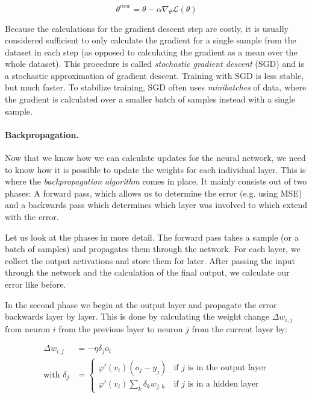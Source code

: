 \begin{equation*}
  \theta^{new} = \theta - \alpha \nabla_\theta \mathcal{L}(\theta)
\end{equation*}

Because the calculations for the gradient descent step are costly, it is usually considered sufficient to only calculate the gradient for a single sample from the dataset in each step (as opposed to calculating the gradient as a mean over the whole dataset). This procedure is called \textit{stochastic gradient descent} (SGD) and is a stochastic approximation of gradient descent. Training with SGD is less stable, but much faster. To stabilize training, SGD often uses \textit{minibatches} of data, where the gradient is calculated over a smaller batch of samples instead with a single sample.

\paragraph{Backpropagation.} Now that we know how we can calculate updates for the neural network, we need to know how it is possible to update the weights for each individual layer. This is where the \textit{backpropagation algorithm} comes in place. It mainly consists out of two phases: A forward pass, which allows us to determine the error (e.g. using MSE) and a backwards pass which determines which layer was involved to which extend with the error.

Let us look at the phases in more detail. The forward pass takes a sample (or a batch of samples) and propagates them through the network. For each layer, we collect the output activations and store them for later. After passing the input through the network and the calculation of the final output, we calculate our error like before. 

In the second phase we begin at the output layer and propagate the error backwards layer by layer. This is done by calculating the weight change $\Delta w_{i, j}$ from neuron $i$ from the previous layer to neuron $j$ from the current layer by:

\begin{align*}
  \Delta w_{i, j} &= -\eta \delta_j o_i \\
  \text{with } \delta_j &= \begin{cases}
    \varphi'(v_i)(o_j - y_j) & \text{if $j$ is in the output layer}  \\
    \varphi'(v_i) \sum_k \delta_k w_{j,k} & \text{if $j$ is in a hidden layer}
  \end{cases}
\end{align*}

